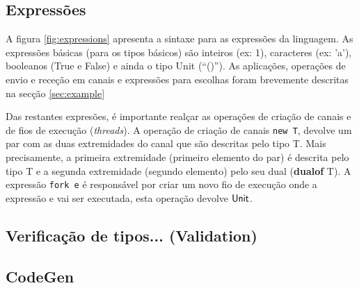 \subsection{Expressões}
A figura \ref{fig:expressions} apresenta a sintaxe para as expressões da linguagem. As expressões básicas (para os tipos básicos) são inteiros (ex: 1), caracteres (ex: 'a'), booleanos (True e False) e ainda o tipo Unit (``()'').
As aplicações, operações de envio e receção em canais e expressões para escolhas foram brevemente descritas na secção \ref{sec:example}

Das restantes expresões, é importante realçar as operações de criação de canais e de fios de execução (\textit{threads}).
A operação de criação de canais \lstinline"new T", devolve um par com as duas extremidades do canal que são descritas pelo tipo T. Mais precisamente, a primeira extremidade (primeiro elemento do par) é descrita pelo tipo T e a segunda extremidade (segundo elemento) pelo seu dual (\textbf{dualof} T).
A expressão \lstinline"fork e" é responsável por criar um novo fio de execução onde a expressão e vai ser executada, esta operação devolve $\mathsf{Unit}$.



\subsection{Verificação de tipos... (Validation)}

\subsection{CodeGen}




